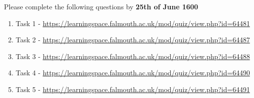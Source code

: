 \documentclass{../../../fal_assignment}
\begin{document}
	Please complete the following questions by \textbf{25th of June 1600}
	
	\begin{enumerate}
		\item Task 1 - \url{https://learningspace.falmouth.ac.uk/mod/quiz/view.php?id=64481}
		\item Task 2 - \url{https://learningspace.falmouth.ac.uk/mod/quiz/view.php?id=64487}
		\item Task 3 - \url{https://learningspace.falmouth.ac.uk/mod/quiz/view.php?id=64488}
		\item Task 4 - \url{https://learningspace.falmouth.ac.uk/mod/quiz/view.php?id=64490}
		\item Task 5 - \url{https://learningspace.falmouth.ac.uk/mod/quiz/view.php?id=64491}
	\end{enumerate}
	
\end{document}
